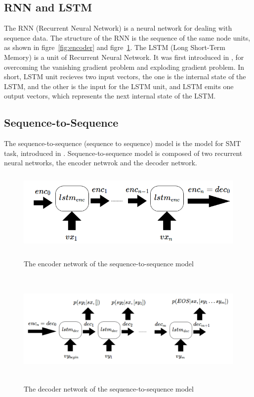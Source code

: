\documentclass[senior,final,11pt]{iscs-thesis}
\begin{document}
\subsection{RNN and LSTM}
The RNN (Recurrent Neural Network) is a neural network for dealing with sequence data.
The structure of the RNN is the sequence of the same node units, as shown in figre~\ref{fig:encoder} and figre~\ref{fig:decoder}. 
The LSTM (Long Short-Term Memory) is a unit of Recurrent Neural Network. 
It was first introduced in \cite{first_LSTM}, for overcoming the vanishing gradient problem and exploding gradient problem.
In short, LSTM unit recieves two input vectors, 
the one is the internal state of the LSTM, and the other is the input for the LSTM unit, 
and LSTM emits one output vectors, which represents the next internal state of the LSTM.

\subsection{Sequence-to-Sequence}


The sequence-to-sequence (sequence to sequence) model is the model for SMT task, introduced in  \cite{seq2seq}.
Sequence-to-sequence model is composed of two recurrent neural networks, the encoder netwrok and the decoder network.

\begin{figure}[]
	\begin{center}
	\includegraphics[height=4cm]{encoder.png}
	\end{center}
	\caption{The encoder network of the sequence-to-sequence model}
	\label{fig:encoder}
	\begin{center}
	\includegraphics[height=5.7cm]{decoder.png}
	\end{center}
	\caption{ The decoder network of the sequence-to-sequence model}
	\label{fig:decoder}
\end{figure}
\end{document}
